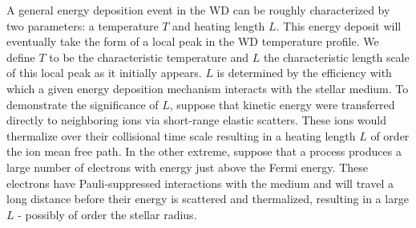 \documentclass[twocolumn,showpacs,preprintnumbers,amsmath,amssymb,prd]{revtex4}
\begin{document}
A general energy deposition event in the WD can be roughly characterized by two parameters: a temperature $T$ and heating length $L$. This energy deposit will eventually take the form of a local peak in the WD temperature profile. We define $T$ to be the characteristic temperature and $L$ the characteristic length scale of this local peak as it initially appears. $L$ is determined by the efficiency with which a given energy deposition mechanism interacts with the stellar medium. To demonstrate the significance of $L$, suppose that kinetic energy were transferred directly to neighboring ions via short-range elastic scatters. These ions would thermalize over their collisional time scale resulting in a heating length $L$ of order the ion mean free path. In the other extreme, suppose that a process produces a large number of electrons with energy just above the Fermi energy.  These electrons have Pauli-suppressed interactions with the medium and will travel a long distance before their energy is scattered and thermalized, resulting in a large $L$ - possibly of order the stellar radius.
\end{document}
